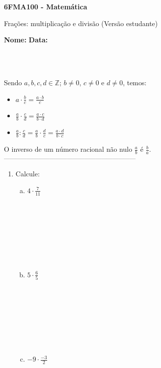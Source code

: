 \documentclass[a4paper,14pt]{article}
\begin{document}
	
	\noindent\textbf{6FMA100 - Matemática} 
	
	\begin{center}Frações: multiplicação e divisão (Versão estudante)
	\end{center}
	
	\noindent\textbf{Nome:} \underline{\hspace{10cm}}
	\noindent\textbf{Data:} \underline{\hspace{4cm}}
	
	~ \\ ~
	\begin{multicols}{2}
		\noindent Sendo $a, b, c, d \in \mathbb{Z}$; $b \neq 0$, $c \neq 0$ e $d \neq 0$, temos:
		\begin{itemize}
			\item $a \cdot \frac{b}{c} = \frac{a \cdot b}{c}$ 
			\item $\frac{a}{b} \cdot \frac{c}{d} = \frac{a \cdot c}{b \cdot d}$
			\item $\frac{a}{b} : \frac{c}{d} = \frac{a}{b} \cdot \frac{d}{c} = \frac{a \cdot d}{b \cdot c}$
		\end{itemize}
		O inverso de um número racional não nulo $\frac{a}{b}$ é $\frac{b}{a}$.
		\textsubscript{---------------------------------------------------------------------}
    	\begin{enumerate}
    		\item Calcule:
    		\begin{enumerate}[a)]
    			\item $4 \cdot \frac{7}{11}$ \\\\\\\\\\\\\\\\
    			\item $5 \cdot \frac{6}{5}$ \\\\\\\\\\\\\\\\
    			\item $-9 \cdot \frac{-3}{2}$ \\\\\\\\\\\\\\\\

\end{enumerate}
\end{enumerate}
\end{multicols}
\end{document}
